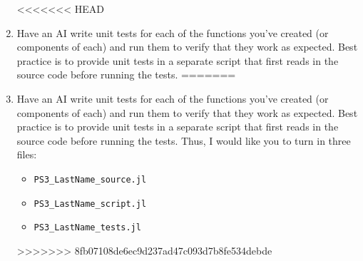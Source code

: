 \documentclass[12pt,english]{article}
\begin{document}
\begin{enumerate}
<<<<<<< HEAD
\item Have an AI write unit tests for each of the functions you've created (or components of each) and run them to verify that they work as expected. Best practice is to provide unit tests in a separate script that first reads in the source code before running the tests.
=======
\item Have an AI write unit tests for each of the functions you've created (or components of each) and run them to verify that they work as expected. Best practice is to provide unit tests in a separate script that first reads in the source code before running the tests. Thus, I would like you to turn in three files:
    \begin{itemize}
        \item \texttt{PS3\_LastName\_source.jl}
        \item \texttt{PS3\_LastName\_script.jl}
        \item \texttt{PS3\_LastName\_tests.jl}
    \end{itemize}
>>>>>>> 8fb07108de6ec9d237ad47c093d7b8fe534debde

\end{enumerate}
\end{document}

